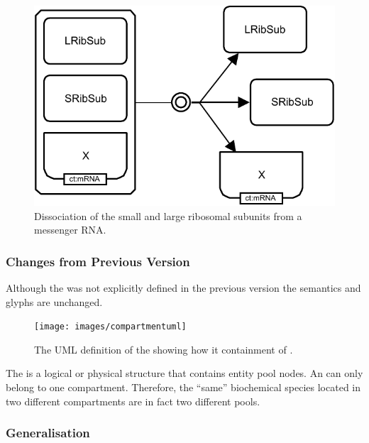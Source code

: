 \begin{figure}[htb]
  \centering
  \includegraphics[scale = 0.3]{examples/dissociation-ribosome}
  \caption{Dissociation of the small and large ribosomal subunits from a messenger RNA.}
  \label{fig:techref:dissoc-ribo}
\end{figure}

\subsubsection{Changes from Previous Version}

Although the  was not explicitly defined in
the previous version the semantics and glyphs are unchanged.

\label{sec:techrefcompartment}
\label{defn:Compartment}

\begin{figure}[htb]
  \centering
  \texttt{[image: images/compartmentuml]}
  \caption{The UML definition of the  showing
    how it containment of .}
  \label{fig:techref:compartmentuml}
\end{figure}

The  is a logical or physical structure that
contains entity pool nodes. An  can only
belong to one compartment. Therefore, the ``same'' biochemical species
located in two different compartments are in fact two different pools.


\subsubsection{Generalisation}

